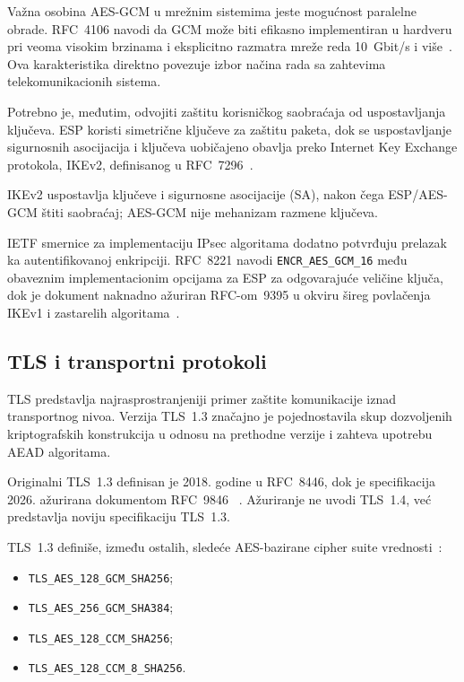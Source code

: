 Važna osobina AES-GCM u mrežnim sistemima jeste mogućnost paralelne
obrade. RFC~4106 navodi da GCM može biti efikasno implementiran u
hardveru pri veoma visokim brzinama i eksplicitno razmatra mreže reda
10~Gbit/s i više~\cite{rfc4106}. Ova karakteristika direktno povezuje
izbor načina rada sa zahtevima telekomunikacionih sistema.

Potrebno je, međutim, odvojiti zaštitu korisničkog saobraćaja od
uspostavljanja ključeva. ESP koristi simetrične ključeve za zaštitu
paketa, dok se uspostavljanje sigurnosnih asocijacija i ključeva
uobičajeno obavlja preko Internet Key Exchange protokola, IKEv2,
definisanog u RFC~7296~\cite{rfc7296}.

IKEv2 uspostavlja ključeve i sigurnosne asocijacije (SA), nakon čega
ESP/AES-GCM štiti saobraćaj; AES-GCM nije mehanizam razmene ključeva.

IETF smernice za implementaciju IPsec algoritama dodatno potvrđuju
prelazak ka autentifikovanoj enkripciji. RFC~8221 navodi
\texttt{ENCR\_AES\_GCM\_16} među obaveznim implementacionim opcijama
za ESP za odgovarajuće veličine ključa, dok je dokument naknadno
ažuriran RFC-om~9395 u okviru šireg povlačenja IKEv1 i zastarelih
algoritama~\cite{rfc8221,rfc9395}.


\subsection{TLS i transportni protokoli}
\label{subsec:tls}

TLS predstavlja najrasprostranjeniji primer zaštite komunikacije iznad
transportnog nivoa. Verzija TLS~1.3 značajno je pojednostavila skup
dozvoljenih kriptografskih konstrukcija u odnosu na prethodne verzije i
zahteva upotrebu AEAD algoritama.

Originalni TLS~1.3 definisan je 2018. godine u RFC~8446, dok je
specifikacija 2026. ažurirana dokumentom RFC~9846
~\cite{rfc8446,rfc9846}. Ažuriranje ne uvodi TLS~1.4, već predstavlja
noviju specifikaciju TLS~1.3.

TLS~1.3 definiše, između ostalih, sledeće AES-bazirane cipher suite
vrednosti~\cite{rfc9846}:

\begin{itemize}
    \item \texttt{TLS\_AES\_128\_GCM\_SHA256};
    \item \texttt{TLS\_AES\_256\_GCM\_SHA384};
    \item \texttt{TLS\_AES\_128\_CCM\_SHA256};
    \item \texttt{TLS\_AES\_128\_CCM\_8\_SHA256}.
\end{itemize}

